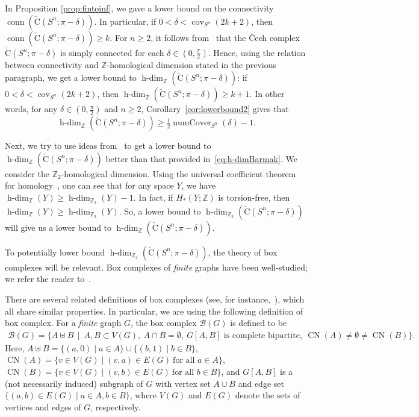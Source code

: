 \documentclass[11 pt,a4paper,twoside,reqno]{amsart}
\theoremstyle{definition}
\def\Z{{\mathbb Z}}
\def\cB{{\mathcal B}}
\newcommand{\cech}[2]{\mathrm{\check{C}}(#1;#2)}
\DeclareMathOperator{\conn}{conn}
\DeclareMathOperator{\cov}{cov}
\DeclareMathOperator{\CN}{CN}
\DeclareMathOperator{\numcov}{numCover}
\DeclareMathOperator{\hdim}{h-dim}
\begin{document}
In Proposition \ref{prop:fintoinf}, we gave a lower bound on the connectivity $\conn(\cech{S^n}{\pi-\delta})$.
In particular, if $0<\delta<\cov_{S^n}(2k+2)$, then $\conn(\cech{S^n}{\pi-\delta}) \ge k$.
For $n\ge 2$, it follows from~\cite[Theorem 11.2]{virk20201} that the \v{C}ech complex $\cech{S^n}{\pi-\delta}$ is simply connected for each $\delta\in (0,\tfrac{\pi}{2})$.
Hence, using the relation between connectivity and $\Z$-homological dimension stated in the previous paragraph, we get a lower bound to $\hdim_{\Z}(\cech{S^n}{\pi-\delta})$:
if $0<\delta<\cov_{S^n}(2k+2)$, then $\hdim_{\Z}(\cech{S^n}{\pi-\delta})\geq k+1$.
In other words, for any $\delta \in (0,\tfrac{\pi}{2})$ and $n\ge 2$, Corollary~\ref{cor:lowerbound2} gives that
\begin{equation}
\label{eq:h-dimBarmak}
\hdim_{\Z}(\cech{S^n}{\pi-\delta})\ge \tfrac{1}{2}\numcov_{S^n}(\delta) - 1.
\end{equation}

Next, we try to use ideas from~\cite[Lemma~4.3]{MatsushitaWakatsuki} to get a lower bound to $\hdim_{\Z}(\cech{S^n}{\pi-\delta})$ better than that provided in~\eqref{eq:h-dimBarmak}.
We consider the $\Z_2$-homological dimension.
Using the universal coefficient theorem for homology~\cite[Theorem~3A.3]{Hatcher}, one can see that for any space $Y$, we have $\hdim_{\Z}(Y)\ge \hdim_{\Z_2}(Y)-1$.
In fact, if $H_*(Y;\Z)$ is torsion-free, then $\hdim_{\Z}(Y)\ge \hdim_{\Z_2}(Y)$.
So, a lower bound to $\hdim_{\Z_2}(\cech{S^n}{\pi-\delta})$ will give us a lower bound to $\hdim_{\Z}(\cech{S^n}{\pi-\delta})$.

To potentially lower bound $\hdim_{\Z_2}(\cech{S^n}{\pi-\delta})$, the theory of box complexes will be relevant.
Box complexes of \emph{finite} graphs have been well-studied; we refer the reader to~\cite{MZ,csorba2007homotopy,MatsushitaWakatsuki}.

There are several related definitions of box complexes {(see, for instance,~\cite{MZ, csorba2007homotopy})}, which all share similar properties.
{In particular, we are using the following definition of box complex.
For a \emph{finite} graph $G$, the box complex $\cB(G)$ is defined to be
\begin{multline*}
\cB(G) = \{A \uplus B \,\mid\ A,B \subset V(G),\ A \cap B = \emptyset,\ G[A,B]\text{ is complete bipartite},\ \CN(A)\neq \emptyset \neq \CN(B)\}.
\end{multline*}
Here, $A\uplus B=\{(a,0)\mid a\in A\}\cup \{(b,1)\mid b\in B\}$, $\CN(A)=\{v\in V(G)\mid (v,a)\in E(G)\ \text{for all }a\in A\}$, {$\CN(B)=\{v\in V(G)\mid (v,b)\in E(G)\ \text{for all }b\in B\}$,} and $G[A,B]$ is a (not necessarily induced) subgraph of $G$ with vertex set $A\cup B$ and edge set $\{(a,b)\in E(G)\mid a\in A, b\in B\}$, where $V(G)$ and $E(G)$ denote the sets of vertices and edges of $G$, respectively.}
\end{document}
